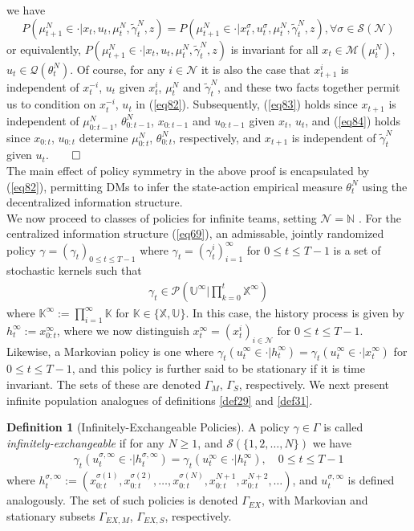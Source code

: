 \documentclass[12pt, oneside]{report}
\newcommand{\mbb}[1]{\mathbb{#1}}
\newcommand{\1}[1]{\mathbbm{1}_{\{#1\}}}
\newcommand{\mc}[1]{\mathcal{#1}}
\theoremstyle{definition}
\newtheorem{definition}[theorem]{Definition}
\begin{document}
we have
\[P(\mu^N_{t+1}\in\cdot|x_t,u_t,\mu^N_t,\widetilde{\gamma}^N_t,z)=P(\mu^N_{t+1}\in\cdot|x^\sigma_t,u^\sigma_t,\mu^N_t,\widetilde{\gamma}^N_t,z),\forall \sigma\in\mc{S}(\mc{N})\]
or equivalently, $P(\mu^N_{t+1}\in\cdot|x_t,u_t,\mu^N_t,\widetilde{\gamma}^N_t,z)$ is invariant for all $x_t\in\mc{M}(\mu^N_t)$, $u_t\in\mc{Q}(\theta^N_t)$. Of course, for any $i\in\mc{N}$ it is
also the case that $x^i_{t+1}$ is independent of $x^{-i}_t$, $u_t$ given $x^i_t$, $\mu^N_t$ and $\widetilde{\gamma}^N_t$, and these two facts together permit us to condition on $x^{-i}_t$, $u_t$ in (\ref{eq82}).
Subsequently, (\ref{eq83}) holds since $x_{t+1}$ is independent of $\mu^N_{0:t-1}$, $\theta^N_{0:t-1}$, $x_{0:t-1}$ and $u_{0:t-1}$ given $x_t$, $u_t$, and (\ref{eq84}) holds since $x_{0:t}$, $u_{0:t}$ determine $\mu^N_{0:t}$, $\theta^N_{0:t}$, respectively,
and $x_{t+1}$ is independent of $\widetilde{\gamma}^N_t$ given $u_t$.\hfill{$\qed$}\\[5pt]
\indent The main effect of policy symmetry in the above proof is encapsulated by (\ref{eq82}), permitting DMs to
infer the state-action empirical measure $\theta^N_t$ using the decentralized information structure.\\[5pt]
\indent We now proceed to classes of policies for infinite teams, setting $\mc{N}=\mbb{N}$ \cite[\S3.2]{Sanjari_Saldi_Yüksel_2024}.
For the centralized information structure (\ref{eq69}), an admissable, jointly randomized policy $\gamma=(\gamma_t)_{0\leq t\leq T-1}$ where $\gamma_t=(\gamma^i_t)_{i=1}^\infty$ for $0\leq t\leq T-1$ is
a set of stochastic kernels such that
\begin{align}
    \gamma_t\in\mc{P}\left(\mbb{U}^\infty\bigg|\prod_{k=0}^t\mbb{X}^\infty\right)
\end{align}
where $\mbb{K}^\infty:=\prod_{i=1}^\infty\mbb{K}$ for $\mbb{K}\in\{\mbb{X},\mbb{U}\}$. In this case, the history process is given by $h^\infty_t:=x^\infty_{0:t}$, where
we now distinguish $x^\infty_t=(x^i_t)_{i\in\mc{N}}$ for $0\leq t\leq T-1$. Likewise, a Markovian policy is one where $\gamma_t(u^\infty_t\in\cdot|h^\infty_t)=\gamma_t(u^\infty_t\in\cdot|x^\infty_t)$ for $0\leq t\leq T-1$,
and this policy is further said to be stationary if it is time invariant. The sets of these are denoted $\Gamma_M$, $\Gamma_S$, respectively. We next present infinite population analogues of definitions \ref{def29} and \ref{def31}.
\begin{definition}[Infinitely-Exchangeable Policies]\label{def32}
    A policy $\gamma\in\Gamma$ is called \textit{infinitely-exchangeable} if for any $N\geq 1$, and $\mc{S}(\{1,2,\dots,N\})$ we have
    \begin{align*}
        \gamma_t(u^{\sigma,\infty}_t\in\cdot|h^{\sigma,\infty}_t)=\gamma_t(u^\infty_t\in\cdot|h^\infty_t),\quad 0\leq t\leq T-1
    \end{align*}
    where $h^{\sigma,\infty}_t:=(x^{\sigma(1)}_{0:t},x^{\sigma(2)}_{0:t},\dots,x^{\sigma(N)}_{0:t},x^{N+1}_{0:t},x^{N+2}_{0:t},\dots)$, and $u^{\sigma,\infty}_t$ is defined analogously. The set of such policies is denoted $\Gamma_{EX}$, with Markovian and stationary subsets
    $\Gamma_{EX,M}$, $\Gamma_{EX,S}$, respectively.
\end{definition}
\end{document}
